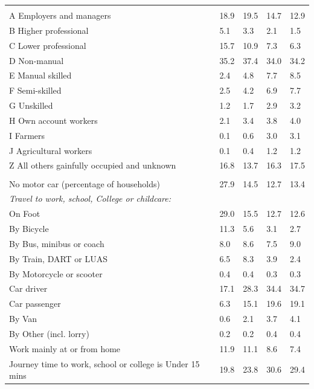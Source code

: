 \documentclass{article}
\begin{document}
\begin{table}[h]
\begin{tabular}{KTTTT}
\hline
    \\ 
    \hline
A Employers and managers & 18.9& 19.5& 14.7& 12.9\\
B Higher professional & 5.1& 3.3& 2.1& 1.5\\
C Lower professional & 15.7& 10.9&  7.3&  6.3\\
D Non-manual & 35.2& 37.4& 34.0& 34.2\\
E Manual skilled & 2.4& 4.8& 7.7& 8.5\\
F Semi-skilled & 2.5& 4.2& 6.9& 7.7\\
G Unskilled & 1.2& 1.7& 2.9& 3.2\\
H Own account workers & 2.1& 3.4& 3.8& 4.0\\
I Farmers & 0.1& 0.6& 3.0& 3.1\\
J Agricultural workers & 0.1& 0.4& 1.2& 1.2\\
Z All others gainfully occupied and unknown & 16.8& 13.7& 16.3& 17.5\\
\hline
{}\hline
    \\ 
    \hline
No motor car (percentage of households) & 27.9& 14.5& 12.7& 
13.4\\
    \hline 
\emph{Travel to work, school, College or childcare:} & & & \\
\quad On Foot & 29.0& 15.5& 12.7& 12.6\\ 
\quad By Bicycle & 11.3&  5.6&  3.1&  2.7\\ 
\quad By Bus, minibus or coach & 8.0& 8.6& 7.5& 9.0\\
\quad By Train, DART or LUAS & 6.5& 8.3& 3.9& 2.4\\
\quad By Motorcycle or scooter & 0.4& 0.4& 0.3& 0.3\\
\quad Car driver & 17.1 & 28.3& 34.4& 34.7\\
\quad Car passenger &  6.3& 15.1& 19.6& 19.1\\
\quad By Van & 0.6& 2.1& 3.7& 4.1\\
\quad By Other (incl. lorry) & 0.2& 0.2& 0.4& 0.4\\
    \hline
Work mainly at or from home & 11.9& 11.1&  8.6&  7.4\\
Journey time to work, school or college is Under 15 mins & 19.8& 23.8& 30.6& 29.4\\

\end{tabular}
\end{table}
\end{document}

